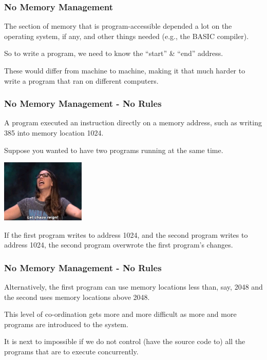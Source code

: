 \begin{frame}
\frametitle{No Memory Management}

The section of memory that is program-accessible depended a lot on the operating system, if any, and other things needed (e.g., the BASIC compiler). 

So to write a program, we need to know the ``start'' \& ``end'' address. 


These would differ from machine to machine, making it that much harder to write a program that ran on different computers.



\end{frame}

\begin{frame}
\frametitle{No Memory Management - No Rules}

A program executed an instruction directly on a memory address, such as writing 385 into memory location 1024. 

Suppose you wanted to have two programs running at the same time. 

\begin{center}
	\includegraphics[width=0.3\textwidth]{images/chaos.jpg}
\end{center}

If the first program writes to address 1024, and the second program writes to address 1024, the second program overwrote the first program's changes. 

\end{frame}

\begin{frame}
\frametitle{No Memory Management - No Rules}

Alternatively, the first program can use memory locations less than, say, 2048 and the second uses memory locations above 2048. 

This level of co-ordination gets more and more difficult as more and more programs are introduced to the system.

It is next to impossible if we do not control (have the source code to) all the programs that are to execute concurrently.



\end{frame}

